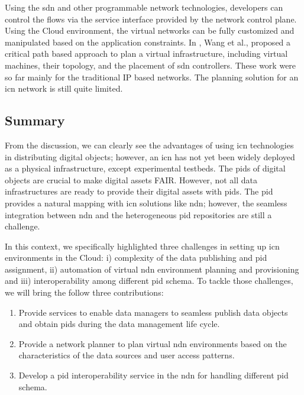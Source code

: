 \documentclass[conference]{IEEEtran}
\begin{document}
Using the \gls{sdn} and other programmable network technologies, developers can control the flows via the service interface provided by the network control plane\cite{koulouzis_sdn-aware_2016}. Using the Cloud environment, the virtual networks can be fully customized and manipulated based on the application constraints. In \cite{wang_planning_2017}\cite{wang_qos-aware_2017}, Wang et al., proposed a critical path based approach to plan a virtual infrastructure, including virtual machines, their topology, and the placement of \gls{sdn} controllers. These work were so far mainly for the traditional IP based networks. The planning solution for an \gls{icn} network is still quite limited. 



\subsection{Summary}
From the discussion, we can clearly see the advantages of using \gls{icn} technologies in distributing digital objects; however, an \gls{icn} has not yet been widely deployed as a physical infrastructure, except experimental testbeds. The \glspl{pid} of digital objects are crucial to make digital assets FAIR. However, not all data infrastructures are ready to provide their digital assets with \glspl{pid}. The \gls{pid} provides a natural mapping with \gls{icn} solutions like \gls{ndn}; however, the seamless integration between \gls{ndn} and the heterogeneous \gls{pid} repositories are still a challenge.

In this context, we specifically highlighted three challenges in setting up \gls{icn} environments in the Cloud: i) complexity of the data publishing and \gls{pid} assignment, ii) automation of virtual \gls{ndn} environment planning and provisioning and iii) interoperability among different \gls{pid} schema. 
To tackle those challenges, we will bring the follow three contributions:
\begin{enumerate}
    \item Provide services to enable data managers to seamless publish data objects and obtain \glspl{pid} during the data management life cycle.
    \item Provide a network planner to plan virtual \gls{ndn} environments based on the characteristics of the data sources and user access patterns.
    \item Develop a \gls{pid} interoperability service in the \gls{ndn} for handling different \gls{pid} schema. 
\end{enumerate}
\end{document}
